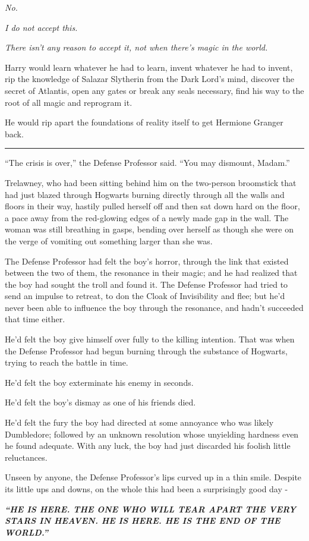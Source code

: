 \emph{No.}

\emph{I do not accept this.}

\emph{There isn't any reason to accept it, not when there's magic in the
world.}

Harry would learn whatever he had to learn, invent whatever he had to
invent, rip the knowledge of Salazar Slytherin from the Dark Lord's
mind, discover the secret of Atlantis, open any gates or break any seals
necessary, find his way to the root of all magic and reprogram it.

He would rip apart the foundations of reality itself to get Hermione
Granger back.

\begin{center}\rule{3in}{0.4pt}\end{center}

``The crisis is over,'' the Defense Professor said. ``You may dismount,
Madam.''

Trelawney, who had been sitting behind him on the two-person broomstick
that had just blazed through Hogwarts burning directly through all the
walls and floors in their way, hastily pulled herself off and then sat
down hard on the floor, a pace away from the red-glowing edges of a
newly made gap in the wall. The woman was still breathing in gasps,
bending over herself as though she were on the verge of vomiting out
something larger than she was.

The Defense Professor had felt the boy's horror, through the link that
existed between the two of them, the resonance in their magic; and he
had realized that the boy had sought the troll and found it. The Defense
Professor had tried to send an impulse to retreat, to don the Cloak of
Invisibility and flee; but he'd never been able to influence the boy
through the resonance, and hadn't succeeded that time either.

He'd felt the boy give himself over fully to the killing intention. That
was when the Defense Professor had begun burning through the substance
of Hogwarts, trying to reach the battle in time.

He'd felt the boy exterminate his enemy in seconds.

He'd felt the boy's dismay as one of his friends died.

He'd felt the fury the boy had directed at some annoyance who was likely
Dumbledore; followed by an unknown resolution whose unyielding hardness
even he found adequate. With any luck, the boy had just discarded his
foolish little reluctances.

Unseen by anyone, the Defense Professor's lips curved up in a thin
smile. Despite its little ups and downs, on the whole this had been a
surprisingly good day -

\textbf{\emph{``HE IS HERE. THE ONE WHO WILL TEAR APART THE VERY STARS
IN HEAVEN. HE IS HERE. HE IS THE END OF THE WORLD.''}}
